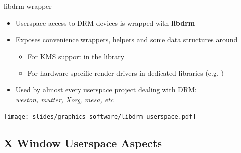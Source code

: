 \begin{frame}{libdrm wrapper}
  \begin{itemize}
  \item Userspace access to DRM devices is wrapped with \textbf{libdrm}
  \item Exposes convenience wrappers, helpers and some data structures around 
    \begin{itemize}
    \item For KMS support in the  library
    \item For hardware-specific render drivers in dedicated libraries (e.g. )
    \end{itemize}
  \item Used by almost every userspace project dealing with DRM:\\
    \textit{weston, mutter, Xorg, mesa, etc}
  \end{itemize}

  \begin{center}
  \texttt{[image: slides/graphics-software/libdrm-userspace.pdf]}
  \end{center}
\end{frame}

\subsection{X Window Userspace Aspects}

